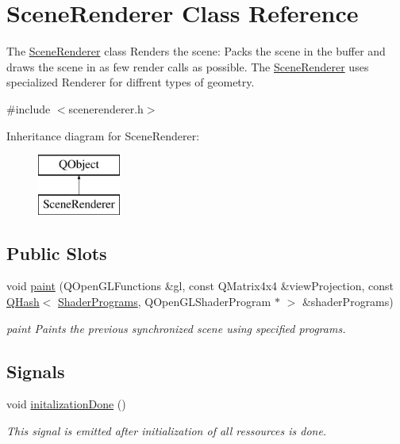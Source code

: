\hypertarget{class_scene_renderer}{}\section{Scene\+Renderer Class Reference}
\label{class_scene_renderer}


The \hyperlink{class_scene_renderer}{Scene\+Renderer} class  Renders the scene\+: Packs the scene in the buffer and draws the scene in as few render calls as possible. The \hyperlink{class_scene_renderer}{Scene\+Renderer} uses specialized Renderer for diffrent types of geometry.  




{\ttfamily \#include $<$scenerenderer.\+h$>$}

Inheritance diagram for Scene\+Renderer\+:\begin{figure}[H]
\begin{center}
\leavevmode
\includegraphics[height=2.000000cm]{class_scene_renderer}
\end{center}
\end{figure}
\subsection*{Public Slots}
\begin{DoxyCompactItemize}
\item 
void \hyperlink{class_scene_renderer_a91177b285ac9fba685e8409671eac1e7}{paint} (Q\+Open\+G\+L\+Functions \&gl, const Q\+Matrix4x4 \&view\+Projection, const \hyperlink{class_q_hash}{Q\+Hash}$<$ \hyperlink{shaderprograms_8h_ada89718f8d394b2cc093eb9770c554ff}{Shader\+Programs}, Q\+Open\+G\+L\+Shader\+Program $\ast$ $>$ \&shader\+Programs)
\begin{DoxyCompactList}\small\item\em paint Paints the previous synchronized scene using specified programs. \end{DoxyCompactList}\end{DoxyCompactItemize}
\subsection*{Signals}
\begin{DoxyCompactItemize}
\item 
void \hyperlink{class_scene_renderer_a9ea8f56371c7758519c5e6541519d988}{initalization\+Done} ()
\begin{DoxyCompactList}\small\item\em This signal is emitted after initialization of all ressources is done. \end{DoxyCompactList}\end{DoxyCompactItemize}
